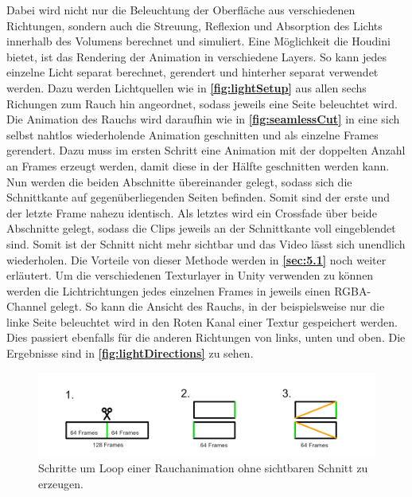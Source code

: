 Dabei wird nicht nur die Beleuchtung der Oberfläche aus verschiedenen Richtungen, sondern auch die Streuung, Reflexion und Absorption des Lichts innerhalb
des Volumens berechnet und simuliert.
Eine Möglichkeit die Houdini bietet, ist das Rendering der Animation in verschiedene Layers. So kann jedes einzelne Licht separat berechnet, gerendert und
hinterher separat verwendet werden. Dazu werden Lichtquellen wie in \textbf{\autoref{fig:lightSetup}} aus allen sechs Richungen zum Rauch hin angeordnet,
sodass jeweils eine Seite beleuchtet wird.
Die Animation des Rauchs wird daraufhin wie in \textbf{\autoref{fig:seamlessCut}} in eine sich selbst nahtlos wiederholende Animation
geschnitten und als einzelne Frames gerendert. Dazu muss im ersten Schritt eine Animation mit der doppelten Anzahl an Frames erzeugt werden, damit diese in der Hälfte
geschnitten werden kann. Nun werden die beiden Abschnitte übereinander gelegt, sodass sich die Schnittkante auf gegenüberliegenden Seiten befinden. Somit sind der erste
und der letzte Frame nahezu identisch. Als letztes wird ein Crossfade über beide Abschnitte gelegt, sodass die Clips jeweils an der Schnittkante voll eingeblendet
sind. Somit ist der Schnitt nicht mehr sichtbar und das Video lässt sich unendlich wiederholen. Die Vorteile von dieser Methode werden in \textbf{\autoref{sec:5.1}}
noch weiter erläutert.
Um die verschiedenen Texturlayer in Unity verwenden zu können werden die Lichtrichtungen jedes einzelnen Frames in jeweils einen RGBA-Channel gelegt.
So kann die Ansicht des Rauchs, in der beispielsweise nur die linke Seite beleuchtet wird in den Roten Kanal einer Textur gespeichert werden.
Dies passiert ebenfalls für die anderen Richtungen von links, unten und oben. Die Ergebnisse sind in \textbf{\autoref{fig:lightDirections}} zu sehen.



\begin{figure}[h!]
	\includegraphics[width=\textwidth]{Grafiken/Implementation/Lightmaps/SeamlessCut.png}
	\centering
	\begin{footnotesize}
		\caption{Schritte um Loop einer Rauchanimation ohne sichtbaren Schnitt zu erzeugen. }
		\label{fig:seamlessCut}
	\end{footnotesize}
\end{figure}

